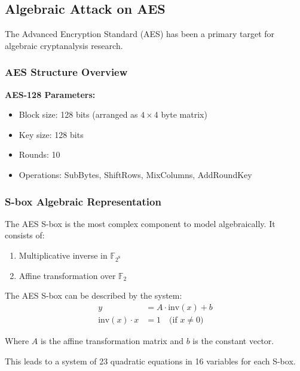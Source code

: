 \documentclass[12pt,a4paper]{article}
\newcommand{\GF}[1]{\mathbb{F}_{#1}}
\begin{document}
\subsection{Algebraic Attack on AES}

The Advanced Encryption Standard (AES) has been a primary target for algebraic cryptanalysis research.

\subsubsection{AES Structure Overview}

\begin{mathematicsbox}
\textbf{AES-128 Parameters:}
\begin{itemize}
    \item Block size: 128 bits (arranged as $4 \times 4$ byte matrix)
    \item Key size: 128 bits
    \item Rounds: 10
    \item Operations: SubBytes, ShiftRows, MixColumns, AddRoundKey
\end{itemize}
\end{mathematicsbox}

\subsubsection{S-box Algebraic Representation}

The AES S-box is the most complex component to model algebraically. It consists of:
\begin{enumerate}
    \item Multiplicative inverse in $\GF{2^8}$
    \item Affine transformation over $\GF{2}$
\end{enumerate}

\begin{examplebox}[title=AES S-box Equations]
The AES S-box can be described by the system:
\begin{align}
y &= A \cdot \text{inv}(x) + b \\
\text{inv}(x) \cdot x &= 1 \quad \text{(if } x \neq 0 \text{)}
\end{align}

Where $A$ is the affine transformation matrix and $b$ is the constant vector.

This leads to a system of 23 quadratic equations in 16 variables for each S-box.
\end{examplebox}
\end{document}
